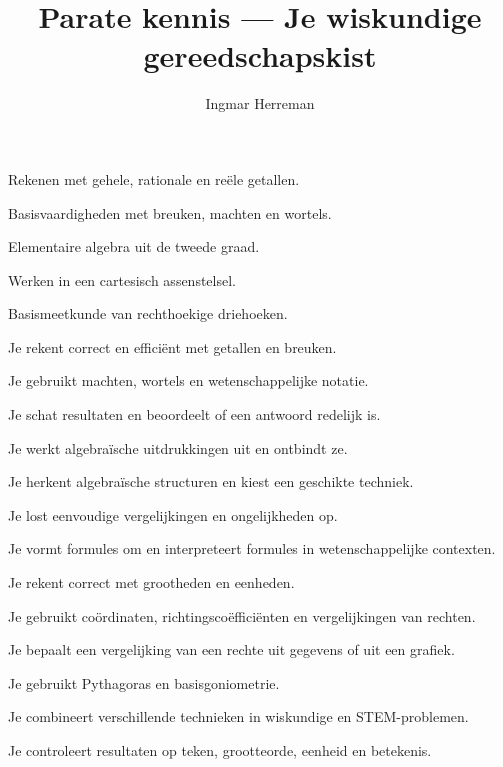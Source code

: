 \documentclass{ximera}
\title{Parate kennis --- Je wiskundige gereedschapskist}
\author{Ingmar Herreman}
\begin{document}




















\maketitle



\begin{voorkennis}
\item Rekenen met gehele, rationale en reële getallen.
\item Basisvaardigheden met breuken, machten en wortels.
\item Elementaire algebra uit de tweede graad.
\item Werken in een cartesisch assenstelsel.
\item Basismeetkunde van rechthoekige driehoeken.
\end{voorkennis}


\begin{leerdoelen}
\item Je rekent correct en efficiënt met getallen en breuken.
\item Je gebruikt machten, wortels en wetenschappelijke notatie.
\item Je schat resultaten en beoordeelt of een antwoord redelijk is.
\item Je werkt algebraïsche uitdrukkingen uit en ontbindt ze.
\item Je herkent algebraïsche structuren en kiest een geschikte techniek.
\item Je lost eenvoudige vergelijkingen en ongelijkheden op.
\item Je vormt formules om en interpreteert formules in wetenschappelijke contexten.
\item Je rekent correct met grootheden en eenheden.
\item Je gebruikt coördinaten, richtingscoëfficiënten en vergelijkingen van rechten.
\item Je bepaalt een vergelijking van een rechte uit gegevens of uit een grafiek.
\item Je gebruikt Pythagoras en basisgoniometrie.
\item Je combineert verschillende technieken in wiskundige en STEM-problemen.
\item Je controleert resultaten op teken, grootteorde, eenheid en betekenis.
\end{leerdoelen}
\end{document}

